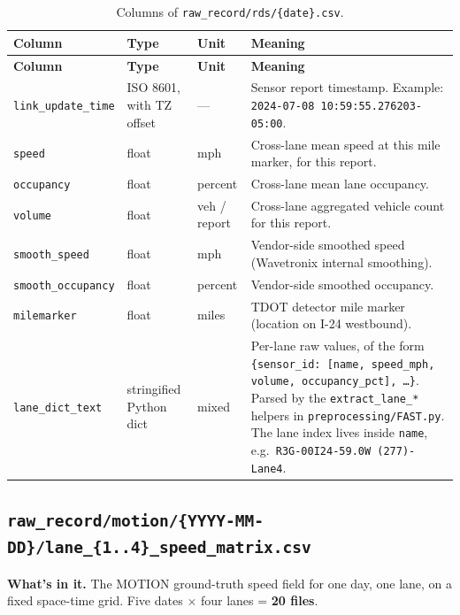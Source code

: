 \documentclass[11pt]{article}
\newcommand{\code}[1]{\texttt{#1}}
\newcommand{\filename}[1]{\textcolor{accent}{\code{#1}}}
\begin{document}
\begin{longtable}{L{3.4cm} L{2.4cm} L{1.6cm} L{8.0cm}}
\caption{Columns of \code{raw\_record/rds/\{date\}.csv}.}
\label{tab:rds-raw-record}\\
\toprule
\textbf{Column} & \textbf{Type} & \textbf{Unit} & \textbf{Meaning} \\
\midrule
\endfirsthead
\toprule
\textbf{Column} & \textbf{Type} & \textbf{Unit} & \textbf{Meaning} \\
\midrule
\endhead
\code{link\_update\_time}    & ISO 8601, with TZ offset     & ---       & Sensor report timestamp. Example: \code{2024-07-08 10:59:55.276203-05:00}. \\
\code{speed}                 & float                        & mph       & Cross-lane mean speed at this mile marker, for this report. \\
\code{occupancy}             & float                        & percent   & Cross-lane mean lane occupancy. \\
\code{volume}                & float                        & veh / report & Cross-lane aggregated vehicle count for this report. \\
\code{smooth\_speed}         & float                        & mph       & Vendor-side smoothed speed (Wavetronix internal smoothing). \\
\code{smooth\_occupancy}     & float                        & percent   & Vendor-side smoothed occupancy. \\
\code{milemarker}            & float                        & miles     & TDOT detector mile marker (location on I-24 westbound). \\
\code{lane\_dict\_text}      & stringified Python dict      & mixed     & Per-lane raw values, of the form \code{\{sensor\_id: [name, speed\_mph, volume, occupancy\_pct], \dots\}}. Parsed by the \code{extract\_lane\_*} helpers in \code{preprocessing/FAST.py}. The lane index lives inside \code{name}, e.g.\ \code{R3G-00I24-59.0W (277)- Lane4}. \\
\bottomrule
\end{longtable}

\subsection{\filename{raw\_record/motion/\{YYYY-MM-DD\}/lane\_\{1..4\}\_speed\_matrix.csv}}
\label{sec:raw-record-motion}

\textbf{What's in it.} The MOTION ground-truth speed field for one
day, one lane, on a fixed space-time grid. Five dates $\times$ four lanes
= \textbf{20 files}.
\end{document}
